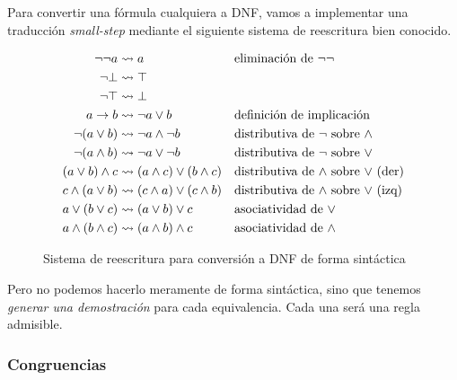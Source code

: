 Para convertir una fórmula cualquiera a DNF, vamos a implementar una traducción
\textit{small-step} mediante el siguiente sistema de reescritura bien conocido.

\begin{figure}[H]
    \begin{align*}
        \neg\neg a &\rightsquigarrow
            a
            &&\text{eliminación de $\neg\neg$}\\
        \neg \bot &\rightsquigarrow
            \top\\
        \neg \top &\rightsquigarrow
            \bot\\
        a \to b &\rightsquigarrow
            \neg a \vee b
            &&\text{definición de implicación}\\
        \neg(a \vee b) &\rightsquigarrow
            \neg a \wedge \neg b
            &&\text{distributiva de $\neg$ sobre $\wedge$}\\
        \neg(a \wedge b) &\rightsquigarrow
            \neg a \vee \neg b
            &&\text{distributiva de $\neg$ sobre $\vee$}\\
        (a \vee b) \wedge c &\rightsquigarrow
            (a \wedge c) \vee (b \wedge c)
            &&\text{distributiva de $\wedge$ sobre $\vee$ (der)}\\
        c \wedge (a \vee b) &\rightsquigarrow
            (c \wedge a) \vee (c \wedge b)
            &&\text{distributiva de $\wedge$ sobre $\vee$ (izq)}\\
        a \vee (b \vee c) &\rightsquigarrow
            (a \vee b) \vee c
            &&\text{asociatividad de $\vee$}\\
        a \wedge (b \wedge c) &\rightsquigarrow
            (a \wedge b) \wedge c
            &&\text{asociatividad de $\wedge$}
    \end{align*}    
    \caption{Sistema de reescritura para conversión a DNF de forma sintáctica}
\end{figure}

Pero no podemos hacerlo meramente de forma sintáctica, sino que tenemos
\textit{generar una demostración} para cada equivalencia. Cada una será una regla admisible.

\subsubsection{Congruencias}

